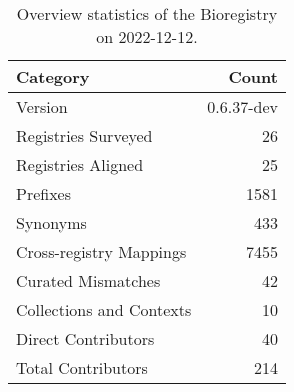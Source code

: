 \begin{table}
\centering
\caption{Overview statistics of the Bioregistry on 2022-12-12.}
\label{tab:bioregistry-summary}
\begin{tabular}{lr}
\toprule
                Category &      Count \\
\midrule
                 Version & 0.6.37-dev \\
     Registries Surveyed &         26 \\
      Registries Aligned &         25 \\
                Prefixes &       1581 \\
                Synonyms &        433 \\
 Cross-registry Mappings &       7455 \\
      Curated Mismatches &         42 \\
Collections and Contexts &         10 \\
     Direct Contributors &         40 \\
      Total Contributors &        214 \\
\bottomrule
\end{tabular}
\end{table}
